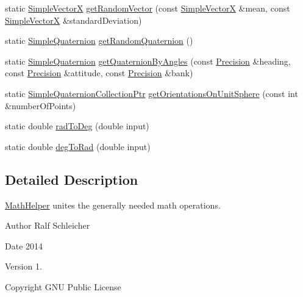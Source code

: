 \begin{DoxyCompactItemize}
\item 
static \hyperlink{namespacenext__best__view_a1b2e77aebfe02c317fdae78c64312df9}{\-Simple\-Vector\-X} \hyperlink{classnext__best__view_1_1MathHelper_aecf6b43cd7b776eb0ed49de5c9563ece}{get\-Random\-Vector} (const \hyperlink{namespacenext__best__view_a1b2e77aebfe02c317fdae78c64312df9}{\-Simple\-Vector\-X} \&mean, const \hyperlink{namespacenext__best__view_a1b2e77aebfe02c317fdae78c64312df9}{\-Simple\-Vector\-X} \&standard\-Deviation)
\item 
static \hyperlink{namespacenext__best__view_a165f1f159539ff8e583fb7fe3620390c}{\-Simple\-Quaternion} \hyperlink{classnext__best__view_1_1MathHelper_abb8fcb4676a05c554ed08003f6d40c00}{get\-Random\-Quaternion} ()
\item 
static \hyperlink{namespacenext__best__view_a165f1f159539ff8e583fb7fe3620390c}{\-Simple\-Quaternion} \hyperlink{classnext__best__view_1_1MathHelper_ae311b6d284dd76d2fff809235d669f11}{get\-Quaternion\-By\-Angles} (const \hyperlink{namespacenext__best__view_a471681a7c47e921eda8b6b1ba32b1786}{\-Precision} \&heading, const \hyperlink{namespacenext__best__view_a471681a7c47e921eda8b6b1ba32b1786}{\-Precision} \&attitude, const \hyperlink{namespacenext__best__view_a471681a7c47e921eda8b6b1ba32b1786}{\-Precision} \&bank)
\item 
static \*
\hyperlink{namespacenext__best__view_a56eab77c28120ee9265ea6fa82a4a3c5}{\-Simple\-Quaternion\-Collection\-Ptr} \hyperlink{classnext__best__view_1_1MathHelper_a2ef19f1c28aa6e71788ba5446baebe5f}{get\-Orientations\-On\-Unit\-Sphere} (const int \&number\-Of\-Points)
\item 
static double \hyperlink{classnext__best__view_1_1MathHelper_a532504a5b9b1c811669557385d05bdaf}{rad\-To\-Deg} (double input)
\item 
static double \hyperlink{classnext__best__view_1_1MathHelper_a848810d7d5434683c5e3dcfa99c8e774}{deg\-To\-Rad} (double input)
\end{DoxyCompactItemize}


\subsection{\-Detailed \-Description}
\hyperlink{classnext__best__view_1_1MathHelper}{\-Math\-Helper} unites the generally needed math operations. 

\begin{DoxyAuthor}{\-Author}
\-Ralf \-Schleicher 
\end{DoxyAuthor}
\begin{DoxyDate}{\-Date}
2014 
\end{DoxyDate}
\begin{DoxyVersion}{\-Version}
1. 
\end{DoxyVersion}
\begin{DoxyCopyright}{\-Copyright}
\-G\-N\-U \-Public \-License 
\end{DoxyCopyright}


